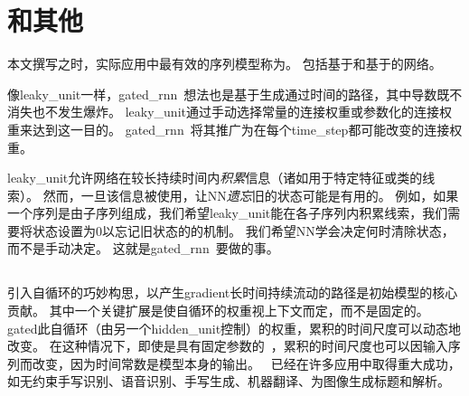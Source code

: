 \section{和其他}
\label{sec:the_long_short_term_memory_and_other_gated_rnns}
本文撰写之时，实际应用中最有效的序列模型称为。
包括基于和基于的网络。

像\gls{leaky_unit}一样，\gls{gated_rnn}~想法也是基于生成通过时间的路径，其中导数既不消失也不发生爆炸。
\gls{leaky_unit}通过手动选择常量的连接权重或参数化的连接权重来达到这一目的。
\gls{gated_rnn}~将其推广为在每个\gls{time_step}都可能改变的连接权重。

\gls{leaky_unit}允许网络在较长持续时间内\emph{积累}信息（诸如用于特定特征或类的线索）。
然而，一旦该信息被使用，让\gls{NN}\emph{遗忘}旧的状态可能是有用的。
例如，如果一个序列是由子序列组成，我们希望\gls{leaky_unit}能在各子序列内积累线索，我们需要将状态设置为0以忘记旧状态的的机制。
我们希望\gls{NN}学会决定何时清除状态，而不是手动决定。
这就是\gls{gated_rnn}~要做的事。

\subsection{}
\label{sec:lstm}
引入自循环的巧妙构思，以产生\gls{gradient}长时间持续流动的路径是初始模型的核心贡献\citep{Hochreiter+Schmidhuber-1997}。
其中一个关键扩展是使自循环的权重视上下文而定，而不是固定的\citep{Gers-et-al-2000}。
\gls{gated}此自循环（由另一个\gls{hidden_unit}控制）的权重，累积的时间尺度可以动态地改变。
在这种情况下，即使是具有固定参数的~，累积的时间尺度也可以因输入序列而改变，因为时间常数是模型本身的输出。
~已经在许多应用中取得重大成功，如无约束手写识别\citep{Graves-et-al-2009}、语音识别\citep{Graves-et-al-ICASSP2013,Graves+Jaitly-ICML2014}、手写生成\citep{Graves-arxiv2013}、机器翻译\citep{Sutskever-et-al-NIPS2014}、为图像生成标题\citep{Kiros-et-al-arxiv2014,Vinyals-et-al-arxiv2014,Xu-et-al-ICML2015}和解析\citep{Vinyals2014}。


